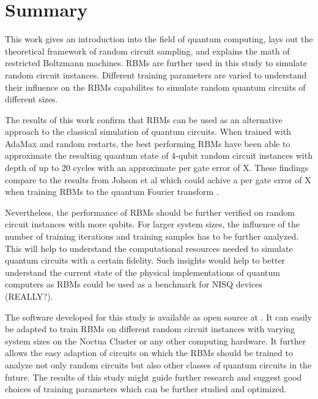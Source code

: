 \chapter{Summary}

This work gives an introduction into the field of quantum computing, lays out the theoretical framework 
of random circuit sampling, and explains the math of restricted Boltzmann machines. RBMs are further used 
in this study to simulate random circuit instances. Different training parameters are varied to understand their 
influence on the RBMs capabilites to simulate random quantum circuits of different sizes. 

The results of this work confirm that RBMs can be used as an alternative approach to the classical 
simulation of quantum circuits. When trained with AdaMax and random restarts, the best performing RBMs
have been able to approximate the resulting quantum state of 4-qubit random circuit instances with depth 
of up to 20 cycles with an approximate per gate error of X. These findings compare to the results from 
Johson et al which could achive a per gate error of X when training RBMs to the quantum Fourier transform \cite{}.

Nevertheless, the performance of RBMs should be further verified on random circuit instances with more qubits. 
For larger system sizes, the influence of the number of training iterations and training samples has to be further 
analyzed. This will help to understand the computational resources needed to simulate quantum circuits 
with a certain fidelity. Such insights would help to better understand the current state of the physical 
implementations of quantum computers as RBMs could be used as a benchmark for NISQ devices (REALLY?).

The software developed for this study is available as open source at \cite{}. It can easily be adapted to 
train RBMs on different random circuit instances with varying system sizes on the Noctua Cluster or any other 
computing hardware. It further allows the easy adaption of circuits on which the RBMs should be trained to 
analyze not only random circuits but also other classes of quantum circuits in the future. The results of this 
study might guide further research and suggest good choices of training parameters which can be further studied and 
optimized.

